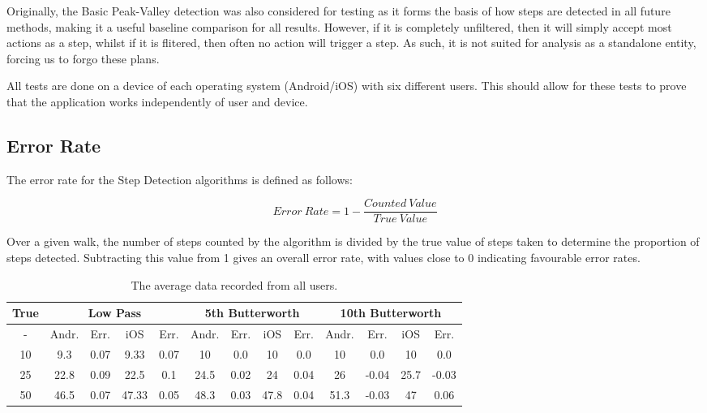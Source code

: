 \documentclass[12pt,a4paper]{report}
\begin{document}
Originally, the Basic Peak-Valley detection was also considered for testing as it forms the basis of how steps are detected in all future methods, making it a useful baseline comparison for all results. However, if it is completely unfiltered, then it will simply accept most actions as a step, whilst if it is flitered, then often no action will trigger a step. As such, it is not suited for analysis as a standalone entity, forcing us to forgo these plans.

All tests are done on a device of each operating system (Android/iOS) with six different users. This should allow for these tests to prove that the application works independently of user and device.

\subsection{Error Rate}

The error rate for the Step Detection algorithms is defined as follows:

\begin{equation}
Error\ Rate = 1 - \frac{Counted\ Value}{True\ Value}
\end{equation}

Over a given walk, the number of steps counted by the algorithm is divided by the true value of steps taken to determine the proportion of steps detected. Subtracting this value from 1 gives an overall error rate, with values close to 0 indicating favourable error rates.



\begin{table}[ht]
	\begin{tabular}{| c || c | c | c | c | c | c | c | c | c | c | c | c |}
		\hline
		True & \multicolumn{4}{c}{Low Pass} & \multicolumn{4}{|c|}{5th Butterworth} & \multicolumn{4}{c|}{10th Butterworth} \\
		\hline
		 - & Andr. & Err. & iOS & Err. & Andr. & Err. & iOS & Err. & Andr. & Err. & iOS & Err.\\
		\hline
		10 & 9.3 & 0.07 & 9.33 & 0.07 & 10 & 0.0 & 10 & 0.0 & 10 & 0.0 & 10 & 0.0 \\ 		
		25 & 22.8 & 0.09 & 22.5 & 0.1 & 24.5 & 0.02 & 24 & 0.04 & 26 & -0.04 & 25.7 & -0.03 \\ 	
		50 & 46.5 & 0.07 & 47.33 & 0.05 & 48.3 & 0.03 & 47.8 & 0.04 & 51.3 & -0.03 & 47 & 0.06\\ 
		\hline	
	\end{tabular}
	\caption{The average data recorded from all users.}
\end{table}
\end{document}
